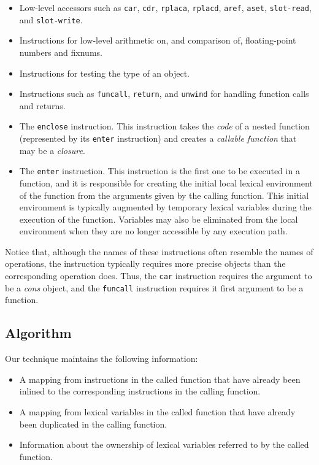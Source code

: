 \begin{itemize}
\item Low-level accessors such as \texttt{car}, \texttt{cdr},
  \texttt{rplaca}, \texttt{rplacd}, \texttt{aref}, \texttt{aset},
  \texttt{slot-read}, and \texttt{slot-write}.
\item Instructions for low-level arithmetic on, and comparison of,
  floating-point numbers and fixnums.
\item Instructions for testing the type of an object.
\item Instructions such as \texttt{funcall}, \texttt{return}, and
  \texttt{unwind} for handling function calls and returns.
\item The \texttt{enclose} instruction.  This instruction takes the
  \emph{code} of a nested function (represented by its \texttt{enter}
  instruction) and creates a \emph{callable function} that may be a
  \emph{closure}.
\item The \texttt{enter} instruction.  This instruction is the first
  one to be executed in a function, and it is responsible for creating
  the initial local lexical environment of the function from the
  arguments given by the calling function.  This initial environment
  is typically augmented by temporary lexical variables during the
  execution of the function.  Variables may also be eliminated from
  the local environment when they are no longer accessible by any
  execution path.
\end{itemize}

Notice that, although the names of these instructions often resemble
the names of \commonlisp{} operations, the instruction typically
requires more precise objects than the corresponding \commonlisp{}
operation does.  Thus, the \texttt{car} instruction requires the
argument to be a \emph{cons} object, and the \texttt{funcall}
instruction requires it first argument to be a function.

\subsection{Algorithm}

Our technique maintains the following information:

\begin{itemize}
\item A mapping from instructions in the called function that have
  already been inlined to the corresponding instructions in the
  calling function.
\item A mapping from lexical variables in the called function that
  have already been duplicated in the calling function.
\item Information about the ownership of lexical variables referred to
  by the called function.
\end{itemize}

